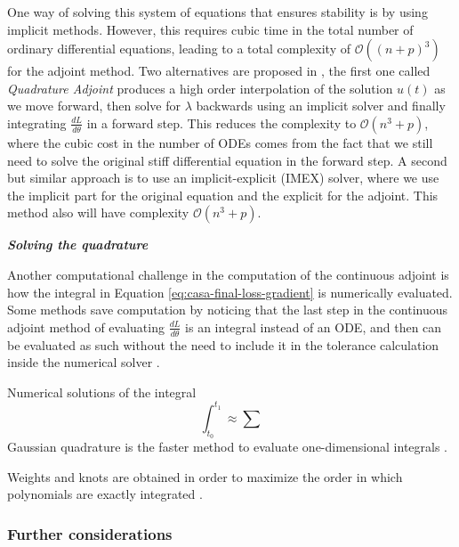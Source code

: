 One way of solving this system of equations that ensures stability is by using implicit methods. 
However, this requires cubic time in the total number of ordinary differential equations, leading to a total complexity of $\mathcal O((n+p)^3)$ for the adjoint method.
Two alternatives are proposed in \cite{kim_stiff_2021}, the first one called \textit{Quadrature Adjoint} produces a high order interpolation of the solution $u(t)$ as we move forward, then solve for $\lambda$ backwards using an implicit solver and finally integrating $\frac{dL}{d\theta}$ in a forward step.
This reduces the complexity to $\mathcal O (n^3 + p)$, where the cubic cost in the number of ODEs comes from the fact that we still need to solve the original stiff differential equation in the forward step. 
A second but similar approach is to use an implicit-explicit (IMEX) solver, where we use the implicit part for the original equation and the explicit for the adjoint. 
This method also will have complexity $\mathcal O (n^3 + p)$.

\vspace*{10px}
\noindent \textbf{\textit{Solving the quadrature}}
\vspace*{5px}

Another computational challenge in the computation of the continuous adjoint is how the integral in Equation \eqref{eq:casa-final-loss-gradient} is numerically evaluated. 
Some methods save computation by noticing that the last step in the continuous adjoint method of evaluating $\frac{dL}{d\theta}$ is an integral instead of an ODE, and then can be evaluated as such without the need to include it in the tolerance calculation inside the numerical solver \autocite{that-is-not-an-ode}.

Numerical solutions of the integral 
\begin{equation}
    \int_{t_0}^{t_1} 
    \approx
    \sum 
\end{equation}
Gaussian quadrature is the faster method to evaluate one-dimensional integrals \cite{Norcliffe_gaussquadrature_2023}.

Weights and knots are obtained in order to maximize the order in which polynomials are exactly integrated \cite{stoer2002-numerical}. 

\subsubsection{Further considerations}

